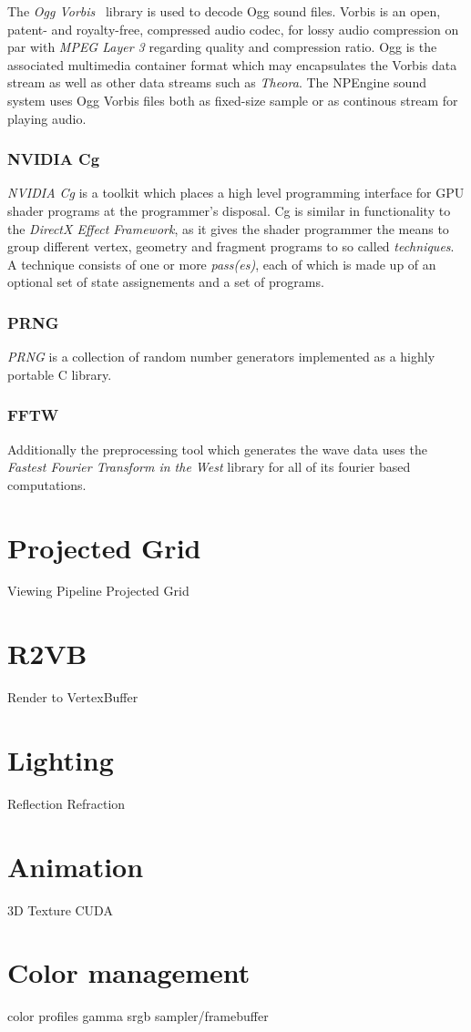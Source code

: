 The \textit{Ogg Vorbis}~\cite{misc:ogg-vorbis} library is used to decode Ogg
sound files. Vorbis is an open, patent- and royalty-free, compressed audio
codec, for lossy audio compression on par with \textit{MPEG Layer 3} regarding
quality and compression ratio. Ogg is the associated multimedia container format
which may encapsulates the Vorbis data stream as well as other data streams such
as \textit{Theora}\cite{misc:ogg-theora}. The NPEngine sound system uses Ogg
Vorbis files both as fixed-size sample or as continous stream for playing audio.

\subsubsection{NVIDIA Cg}

\textit{NVIDIA Cg}\cite{misc:nvcg} is a toolkit which places a high
level programming interface for GPU shader programs at the programmer's
disposal. Cg is similar in functionality to the \textit{DirectX Effect
Framework}\cite{misc:directx}\cite{book:effect-hlsl}, as it gives the
shader programmer the means to group different vertex, geometry and fragment
programs to so called \textit{techniques}. A technique consists of one or more
\textit{pass(es)}, each of which is made up of an optional set of state
assignements and a set of programs.\FIXME{}

\subsubsection{PRNG}

\textit{PRNG}\cite{misc:prng} is a collection of random number generators
implemented as a highly portable C library.

\subsubsection{FFTW}
Additionally the preprocessing tool which generates the wave data uses the
\textit{Fastest Fourier Transform in the West} library\cite{misc:fftw} for all
of its fourier based computations.

\section{Projected Grid}
Viewing Pipeline
Projected Grid

\section{R2VB}
Render to VertexBuffer

\section{Lighting}
Reflection
Refraction

\section{Animation}
3D Texture
CUDA

\section{Color management}
color profiles
gamma
srgb sampler/framebuffer